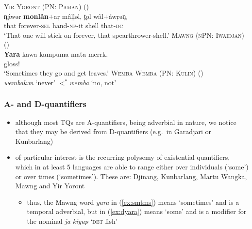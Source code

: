 \documentclass{article}
\begin{document}
\begin{exe}
  \ex\label{ex:4eva} \textsc{Yir Yoront (PN: Paman)} (\citealt[343]{alpher73})\\
  \gll n̪\'awər \textbf{monlån}$+$a\d{r} m\^a\d{l}\d{l}əl, t̪ol w\^al$+$\'aw\d{r}ən̪.\\
  that forever-\textsc{sel} hand-\textsc{np}-it shell that-\textsc{dc}\\
  \glt `That one will stick on forever, that spearthrower-shell.'
  \ex\label{ex:smtms} \textsc{Mawng (nPN: Iwaidjan)} (\citealt{ngaralk})\\
  \gll \textbf{Yara} kawa kampuma mata merrk.\\
  gloss!\\
  \glt `Sometimes they go and get leaves.' %
  \ex\label{ex:never} \textsc{Wemba Wemba (PN: Kulin)} (\citealt[47]{hercus92})\\
  \textit{\charis wembakən} `never' $<^*$\textit{wemba} `no, not'
\end{exe}

\subsubsection{A- and D-quantifiers}
\label{sec:adqfrs}
\begin{itemize}
\item although most TQs are A-quantifiers, being adverbial in nature, we notice that they may be derived from D-quantifiers (e.g.\ in Garadjari or Kunbarlang)
\item of particular interest is the recurring polysemy of existential quantifiers, which in at least 5 languages are able to range either over individuals (`some') or over times (`sometimes'). These are: Djinang, Kunbarlang, Martu Wangka, Mawng and Yir Yoront
  \begin{itemize}
  \item thus, the Mawng word \textit{yara} in (\ref{ex:smtms}) means `sometimes' and is a temporal adverbial, but in (\ref{ex:dyara}) means `some' and is a modifier for the nominal \textit{ja kiyap} `\textsc{det} fish'
  \end{itemize}
\end{itemize}
\end{document}
